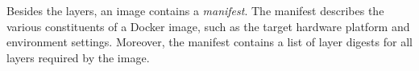 %
%
%





%
%
%
%
%
%
%
%

%
Besides the layers, an image contains a \emph{manifest}.
The manifest describes the various constituents of a Docker image, such as the
target hardware platform and environment settings.
%
Moreover, the manifest contains a list of layer digests for all layers required by the image.
%
%
%

